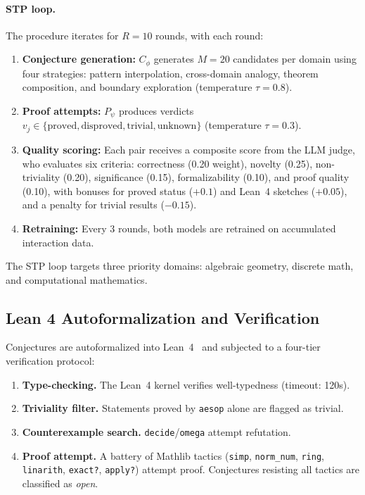 \documentclass[11pt,a4paper]{article}
\begin{document}
\paragraph{STP loop.}
The procedure iterates for $R{=}10$ rounds, with each round:
\begin{enumerate}
    \item \textbf{Conjecture generation:} $C_\phi$ generates $M{=}20$ candidates per domain using four strategies: pattern interpolation, cross-domain analogy, theorem composition, and boundary exploration (temperature $\tau{=}0.8$).
    \item \textbf{Proof attempts:} $P_\psi$ produces verdicts $v_j \in \{\text{proved}, \text{disproved}, \text{trivial}, \text{unknown}\}$ (temperature $\tau{=}0.3$).
    \item \textbf{Quality scoring:} Each pair receives a composite score from the LLM judge, who evaluates six criteria: correctness (0.20 weight), novelty (0.25), non-triviality (0.20), significance (0.15), formalizability (0.10), and proof quality (0.10), with bonuses for proved status ($+0.1$) and Lean~4 sketches ($+0.05$), and a penalty for trivial results ($-0.15$).
    \item \textbf{Retraining:} Every 3 rounds, both models are retrained on accumulated interaction data.
\end{enumerate}

The STP loop targets three priority domains: algebraic geometry, discrete math, and computational mathematics.

\subsection{Lean 4 Autoformalization and Verification}
\label{sec:lean}

Conjectures are autoformalized into Lean~4~\citep{moura2021lean} and subjected to a four-tier verification protocol:

\begin{enumerate}
    \item[\textbf{Tier~1:}] \textbf{Type-checking.} The Lean~4 kernel verifies well-typedness (timeout: 120s).
    \item[\textbf{Tier~2:}] \textbf{Triviality filter.} Statements proved by \texttt{aesop} alone are flagged as trivial.
    \item[\textbf{Tier~3:}] \textbf{Counterexample search.} \texttt{decide}/\texttt{omega} attempt refutation.
    \item[\textbf{Tier~4:}] \textbf{Proof attempt.} A battery of Mathlib tactics (\texttt{simp}, \texttt{norm\_num}, \texttt{ring}, \texttt{linarith}, \texttt{exact?}, \texttt{apply?}) attempt proof. Conjectures resisting all tactics are classified as \emph{open}.
\end{enumerate}
\end{document}

